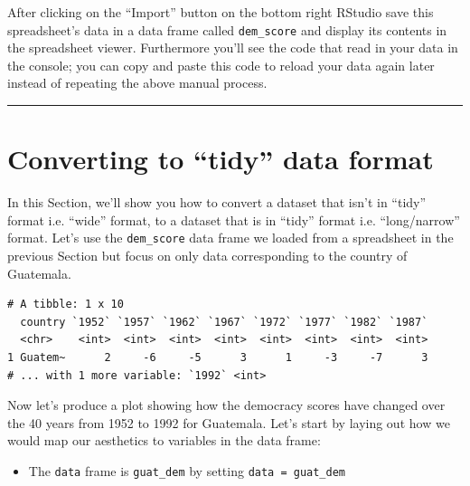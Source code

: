 \documentclass[12pt,]{krantz}
\makeatletter
\newenvironment{Shaded}{\begin{snugshade}}{\end{snugshade}}
\newcommand{\KeywordTok}[1]{\textcolor[rgb]{0.27,0.27,0.27}{\textbf{#1}}}
\newcommand{\StringTok}[1]{\textcolor[rgb]{0.5,0.5,0.5}{#1}}
\newcommand{\OperatorTok}[1]{\textcolor[rgb]{0.43,0.43,0.43}{\textbf{#1}}}
\newcommand{\NormalTok}[1]{#1}
\providecommand{\tightlist}{%
  \setlength{\itemsep}{0pt}\setlength{\parskip}{0pt}}
\newenvironment{kframe}{%
\medskip{}
\setlength{\fboxsep}{.8em}
 \def\at@end@of@kframe{}%
 \ifinner\ifhmode%
  \def\at@end@of@kframe{\end{minipage}}%
  \begin{minipage}{\columnwidth}%
 \fi\fi%
 \def\FrameCommand##1{\hskip\@totalleftmargin \hskip-\fboxsep
 \colorbox{shadecolor}{##1}\hskip-\fboxsep
     \hskip-\linewidth \hskip-\@totalleftmargin \hskip\columnwidth}%
 \MakeFramed {\advance\hsize-\width
   \@totalleftmargin\z@ \linewidth\hsize
   \@setminipage}}%
 {\par\unskip\endMakeFramed%
 \at@end@of@kframe}
\renewenvironment{Shaded}{\begin{kframe}}{\end{kframe}}
\theoremstyle{definition}
\theoremstyle{definition}
\theoremstyle{definition}
\theoremstyle{remark}
\makeatother
\begin{document}
After clicking on the ``Import'' button on the bottom right RStudio save
this spreadsheet's data in a data frame called \texttt{dem\_score} and
display its contents in the spreadsheet viewer. Furthermore you'll see
the code that read in your data in the console; you can copy and paste
this code to reload your data again later instead of repeating the above
manual process.

\begin{center}\rule{0.5\linewidth}{\linethickness}\end{center}

\section{\texorpdfstring{Converting to ``tidy'' data
format}{Converting to tidy data format}}\label{tidying}

In this Section, we'll show you how to convert a dataset that isn't in
``tidy'' format i.e. ``wide'' format, to a dataset that is in ``tidy''
format i.e. ``long/narrow'' format. Let's use the \texttt{dem\_score}
data frame we loaded from a spreadsheet in the previous Section but
focus on only data corresponding to the country of Guatemala.

\begin{Shaded}
\end{Shaded}

\begin{verbatim}
# A tibble: 1 x 10
  country `1952` `1957` `1962` `1967` `1972` `1977` `1982` `1987`
  <chr>    <int>  <int>  <int>  <int>  <int>  <int>  <int>  <int>
1 Guatem~      2     -6     -5      3      1     -3     -7      3
# ... with 1 more variable: `1992` <int>
\end{verbatim}

Now let's produce a plot showing how the democracy scores have changed
over the 40 years from 1952 to 1992 for Guatemala. Let's start by laying
out how we would map our aesthetics to variables in the data frame:

\begin{itemize}
\tightlist
\item
  The \texttt{data} frame is \texttt{guat\_dem} by setting
  \texttt{data\ =\ guat\_dem}
\end{itemize}
\end{document}
